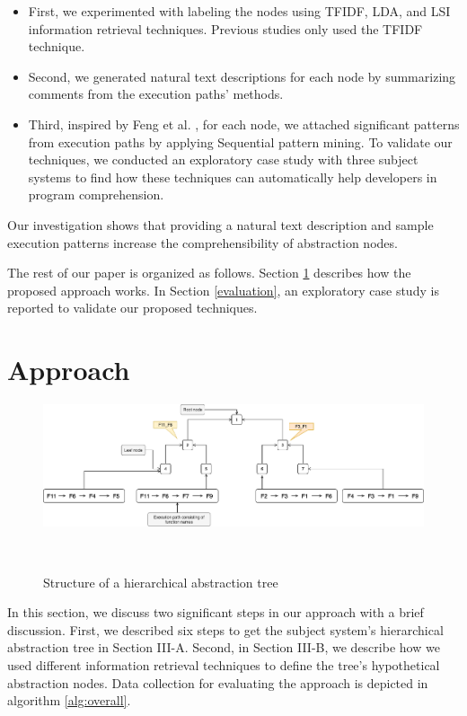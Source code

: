 \begin{itemize}
    \item First, we experimented with labeling the nodes using TFIDF, LDA, and LSI information retrieval techniques. Previous studies only used the TFIDF technique.
    \item Second, we generated natural text descriptions for each node by summarizing comments from the execution paths' methods.
    \item Third, inspired by Feng et al. \cite{feng2018hierarchicalExecutionComprehension}, for each node, we attached significant patterns from execution paths by applying Sequential pattern mining. To validate our techniques, we conducted an exploratory case study with three subject systems to find how these techniques can automatically help developers in program comprehension. 
\end{itemize}

Our investigation shows that providing a natural text description and sample execution patterns increase the comprehensibility of abstraction nodes. 
  
The rest of our paper is organized as follows. Section \ref{approach} describes how the proposed approach works. In Section \ref{evaluation}, an exploratory case study is reported to validate our proposed techniques.


\section{Approach}
\label{approach}
\begin{figure}[tb]
  \centering
  \includegraphics[width=\columnwidth]{figures/hla2/tree_structure.png}
  \caption{Structure of a hierarchical abstraction tree}~\label{fig:tree_structure}
\end{figure}
In this section, we discuss two significant steps in our approach with a brief discussion. First, we described six steps to get the subject system's hierarchical abstraction tree in Section III-A. Second, in Section III-B, we describe how we used different information retrieval techniques to define the tree's hypothetical abstraction nodes. Data collection for evaluating the approach is depicted in algorithm \ref{alg:overall}.


